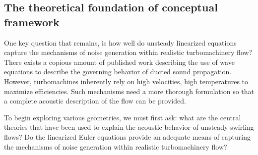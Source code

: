 \subsection{The theoretical foundation of conceptual framework}





 One key question that remains, is how well do unsteady linearized equations capture 
 the mechanisms of noise generation within realistic turbomachinery flow? 
 There exists a copious amount of published work describing the use of wave 
 equations to describe the governing behavior of ducted sound propagation. 
 However, turbomachines inherently rely on high velocities, high temperatures 
 to maximize efficiencies. Such mechanisms need a more thorough formulation so 
 that a complete acoustic description of the flow can be provided. 


To begin exploring various geometries, we must first ask: what are the central 
theories that have been used to explain the acoustic behavior of unsteady swirling flows?
Do the linearized Euler equations provide an adequate means of capturing the mechanisms 
of noise generation within realistic turbomachinery flow?
